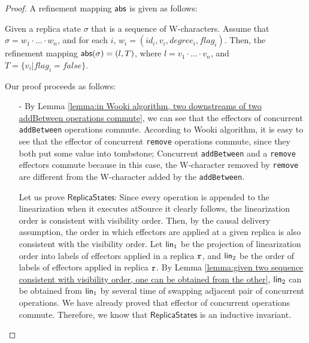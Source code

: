 \begin {proof}

A refinement mapping $\mathsf{abs}$ is given as follows:

Given a replica state $\sigma$ that is a sequence of W-characters. Assume that $\sigma = w_1 \cdot \ldots \cdot w_n$, and for each $i$, $w_i = (id_i,v_i,degree_i,flag_i)$. Then, the refinement mapping $\mathsf{abs}(\sigma) = (l,T)$, where $l = v_1 \cdot \ldots \cdot v_n$, and $T = \{ v_i \vert flag_i = \mathit{false} \}$.

Our proof proceeds as follows:

\begin{itemize}
\setlength{\itemsep}{0.5pt}
\item[-] By Lemma \ref{lemma:in Wooki algorithm, two downstreams of two addBetween operations commute}, we can see that the effectors of concurrent {\tt addBetween} operations commute. According to Wooki algorithm, it is easy to see that the effector of concurrent {\tt remove} operations commute, since they both put some value into tombstone; Concurrent {\tt addBetween} and a {\tt remove} effectors commute because in this case, the W-character removed by {\tt remove} are different from the W-character added by the {\tt addBetween}.

    Let us prove $\mathsf{ReplicaStates}$: Since every operation is appended to the linearization when it executes atSource it clearly follows, the linearization order is consistent with visibility order. Then, by the causal delivery assumption, the order in which effectors are applied at a given replica is also consistent with the visibility order. Let $\mathsf{lin}_1$ be the projection of linearization order into labels of effectors applied in a replica $\mathtt{r}$, and $\mathsf{lin}_2$ be the order of labels of effectors applied in replica $\mathtt{r}$. By Lemma \ref{lemma:given two sequence consistent with visibility order, one can be obtained from the other}, $\mathsf{lin}_2$ can be obtained from $\mathsf{lin}_1$ by several time of swapping adjacent pair of concurrent operations. We have already proved that effector of concurrent operations commute. Therefore, we know that $\mathsf{ReplicaStates}$ is an inductive invariant.


\end{itemize}
\end{proof}
